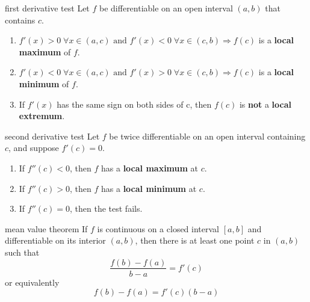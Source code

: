 \documentclass[avery5371,grid]{flashcards}
\begin{document}
\begin{flashcard}[Theorem]{first derivative test}
Let $f$ be differentiable on an open interval $(a,b)$ that contains $c$.
\begin{enumerate}
\item $f'(x)>0 \;\forall x \in (a,c) \text{ and } f'(x)<0 \;\forall x \in (c,b)
\Rightarrow f(c)$ is a \textbf{local maximum} of $f$.
\item $f'(x)<0 \;\forall x \in (a,c) \text{ and } f'(x)>0 \;\forall x \in (c,b)
\Rightarrow f(c)$ is a \textbf{local minimum} of $f$.
\item If $f'(x)$ has the same sign on both sides of c, then $f(c)$ is \textbf{not} a
\textbf{local extremum}.
\end{enumerate}
\end{flashcard}

\begin{flashcard}[Theorem]{second derivative test}
Let $f$ be twice differentiable on an open interval containing $c$,
and suppose $f'(c)=0$.
\begin{enumerate}
\item If $f''(c)<0$, then $f$ has a \textbf{local maximum} at $c$.
\item If $f''(c)>0$, then $f$ has a \textbf{local minimum} at $c$.
\item If $f''(c)=0$, then the test fails.
\end{enumerate}
\end{flashcard}

\begin{flashcard}[Theorem]{mean value theorem}
If $f$ is continuous on a closed interval $[a,b]$ and differentiable
on its interior $(a,b)$, then there is at least one point $c$ in
$(a,b)$ such that
\begin{equation*}
\dfrac{f(b)-f(a)}{b-a}=f'(c)
\end{equation*}
or equivalently
\begin{equation*}
f(b)-f(a)=f'(c)(b-a)
\end{equation*}
\end{flashcard}

\begin{flashcard}[]{}

\end{flashcard}
\end{document}
